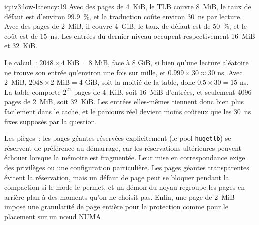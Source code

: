 \begin{solution}{iq:iv3:low-latency:19}
Avec des pages de 4~KiB, le TLB couvre 8~MiB, le taux de défaut est d'environ 99.9~\%, et la traduction coûte environ 30~ns par lecture. Avec des pages de 2~MiB, il couvre 4~GiB, le taux de défaut est de 50~\%, et le coût est de 15~ns. Les entrées du dernier niveau occupent respectivement 16~MiB et 32~KiB.

Le calcul~: $2048 \times 4\text{ KiB} = 8$ MiB, face à 8 GiB, si bien qu'une lecture aléatoire ne trouve son entrée qu'environ une fois sur mille, et $0.999 \times 30 \approx 30$ ns. Avec 2~MiB, $2048 \times 2\text{ MiB} = 4$ GiB, soit la moitié de la table, donc $0.5 \times 30 = 15$ ns. La table comporte $2^{21}$ pages de 4~KiB, soit 16~MiB d'entrées, et seulement 4096 pages de 2~MiB, soit 32~KiB. Les entrées elles-mêmes tiennent donc bien plus facilement dans le cache, et le parcours réel devient moins coûteux que les 30~ns fixes supposés par la question.

Les pièges~: les pages géantes réservées explicitement (le pool \texttt{hugetlb}) se réservent de préférence au démarrage, car les réservations ultérieures peuvent échouer lorsque la mémoire est fragmentée. Leur mise en correspondance exige des privilèges ou une configuration particulière. Les pages géantes transparentes évitent la réservation, mais un défaut de page peut se bloquer pendant la compaction si le mode le permet, et un démon du noyau regroupe les pages en arrière-plan à des moments qu'on ne choisit pas. Enfin, une page de 2~MiB impose une granularité de page entière pour la protection comme pour le placement sur un nœud NUMA.

\end{solution}

